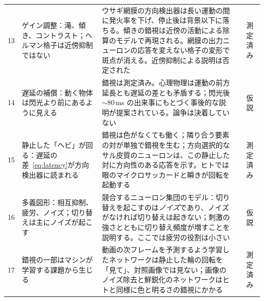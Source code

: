 {\begin{longtable}{>{\raggedright}p{0.5cm}>{\raggedright}p{4.0cm}>{\raggedright}p{5.6cm}>{\raggedright}p{2.3cm}>{\raggedright\arraybackslash}p{1.7cm}}
13 & ゲイン調整：滝、傾き、コントラスト；ヘルマン格子は近傍抑制ではない & ウサギ網膜の方向検出器は長い運動の間に発火率を下げ、停止後は背景以下に落ちる。傾きの錯視は近傍の活動による除算のモデルで再現される。網膜の出力ニューロンの応答を変えない格子の変形で斑点が消える。近傍抑制による説明は否定された & \cite{BarlowHill1963,Schwartz2009,SchillerCarvey2005} & 測定済み \\
14 & 遅延の補償：動く物体は閃光より前にあるように見える & 錯視は測定済み。心理物理は運動の前方延長とも遅延の差とも矛盾する；閃光後 $\sim80$\,ms の出来事にもとづく事後的な説明が提案されている。論争は決着していない & \cite{Nijhawan1994,EaglemanSejnowski2000} & 仮説 \\
15 & 静止した「ヘビ」が回る：遅延の差~\eqref{eq:latency}が方向検出器に読まれる & 錯視は色がなくても働く；隣り合う要素の対が単独で錯視を生む；方向選択的なサル皮質のニューロンは、この静止した対に方向性のある応答を示す。ヒトでは眼のマイクロサッカードと瞬きが回転を起動する & \cite{Conway2005,OteroMillan2012} & 測定済み \\
16 & 多義図形：相互抑制、疲労、ノイズ；切り替えは主にノイズが起こす & 競合するニューロン集団のモデル：切り替えを起こすのは\emph{ノイズ}であり、ノイズがなければ切り替えは起きない；刺激の強さとともに切り替え頻度が増すことを説明する。ここでは疲労の役割は小さい & \cite{MorenoBote2007} & 仮説 \\
17 & 錯視の一部はマシンが学習する課題から生じる & 動画の次フレームを予測するよう学習したネットワークは静止した輪の回転を「見て」、対照画像では見ない；画像のノイズ除去と鮮鋭化のネットワークはヒトと同様に色と明るさの錯視にかかる & \cite{Watanabe2018,GomezVilla2020} & 測定済み \\
\bottomrule
\end{longtable}}
